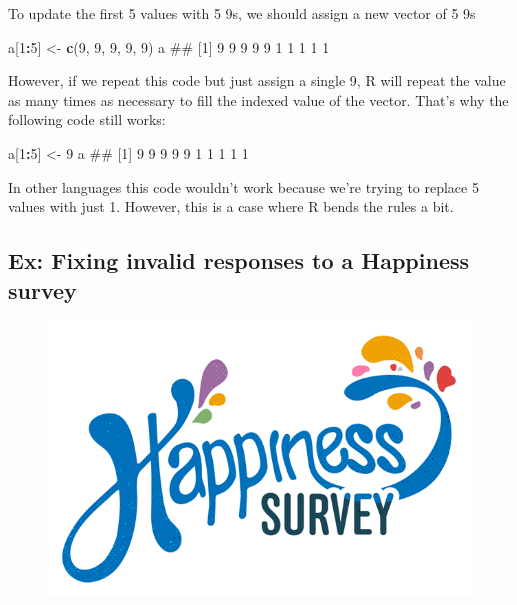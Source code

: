 \documentclass[]{book}
\newenvironment{Shaded}{\begin{snugshade}}{\end{snugshade}}
\newcommand{\KeywordTok}[1]{\textcolor[rgb]{0.13,0.29,0.53}{\textbf{#1}}}
\newcommand{\DecValTok}[1]{\textcolor[rgb]{0.00,0.00,0.81}{#1}}
\newcommand{\StringTok}[1]{\textcolor[rgb]{0.31,0.60,0.02}{#1}}
\newcommand{\OperatorTok}[1]{\textcolor[rgb]{0.81,0.36,0.00}{\textbf{#1}}}
\newcommand{\NormalTok}[1]{#1}
\theoremstyle{definition}
\theoremstyle{definition}
\theoremstyle{remark}
\begin{document}
To update the first 5 values with 5 9s, we should assign a new vector of
5 9s

\begin{Shaded}
\begin{Highlighting}[]
\NormalTok{a[}\DecValTok{1}\OperatorTok{:}\DecValTok{5}\NormalTok{] <-}\StringTok{ }\KeywordTok{c}\NormalTok{(}\DecValTok{9}\NormalTok{, }\DecValTok{9}\NormalTok{, }\DecValTok{9}\NormalTok{, }\DecValTok{9}\NormalTok{, }\DecValTok{9}\NormalTok{)}
\NormalTok{a}
\NormalTok{##  [1] 9 9 9 9 9 1 1 1 1 1}
\end{Highlighting}
\end{Shaded}

However, if we repeat this code but just assign a single 9, R will
repeat the value as many times as necessary to fill the indexed value of
the vector. That's why the following code still works:

\begin{Shaded}
\begin{Highlighting}[]
\NormalTok{a[}\DecValTok{1}\OperatorTok{:}\DecValTok{5}\NormalTok{] <-}\StringTok{ }\DecValTok{9}
\NormalTok{a}
\NormalTok{##  [1] 9 9 9 9 9 1 1 1 1 1}
\end{Highlighting}
\end{Shaded}

In other languages this code wouldn't work because we're trying to
replace 5 values with just 1. However, this is a case where R bends the
rules a bit.

\subsection{Ex: Fixing invalid responses to a Happiness
survey}\label{ex-fixing-invalid-responses-to-a-happiness-survey}

\begin{figure}

{\centering \includegraphics[width=0.5\linewidth]{images/happiness} 

}

\end{figure}
\end{document}
